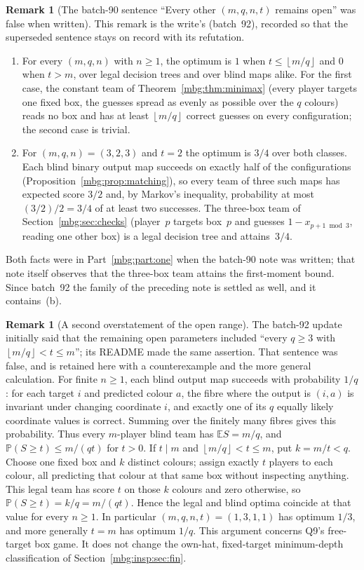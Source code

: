 \documentclass[11pt,letterpaper]{article}
\theoremstyle{definition}
\newtheorem{remark}[theorem]{Remark}
\newcommand{\E}{\mathbb E}
\newcommand{\Prb}{\mathbb P}
\newcommand{\floor}[1]{\left\lfloor #1\right\rfloor}
\begin{document}
\begin{remark}[The batch-90 sentence ``Every other $(m,q,n,t)$ remains open'' was false when written]
\label{mbg:insp:rem:q9-open-claim}
This remark is the write's (batch~92), recorded so that the superseded sentence stays on record with its refutation.
\begin{enumerate}[label=(\alph*)]
\item For every $(m,q,n)$ with $n\ge1$, the optimum is $1$ when $t\le\floor{m/q}$ and $0$ when $t>m$, over legal decision trees and over blind maps alike. For the first case, the constant team of Theorem~\ref{mbg:thm:minimax} (every player targets one fixed box, the guesses spread as evenly as possible over the $q$ colours) reads no box and has at least $\floor{m/q}$ correct guesses on every configuration; the second case is trivial.
\item For $(m,q,n)=(3,2,3)$ and $t=2$ the optimum is $3/4$ over both classes. Each blind binary output map succeeds on exactly half of the configurations (Proposition~\ref{mbg:prop:matching}), so every team of three such maps has expected score $3/2$ and, by Markov's inequality, probability at most $(3/2)/2=3/4$ of at least two successes. The three-box team of Section~\ref{mbg:sec:checks} (player~$p$ targets box~$p$ and guesses $1-x_{p+1\bmod3}$, reading one other box) is a legal decision tree and attains~$3/4$.
\end{enumerate}
Both facts were in Part~\ref{mbg:part:one} when the batch-90 note was written; that note itself observes that the three-box team attains the first-moment bound. Since batch~92 the family of the preceding note is settled as well, and it contains~(b).
\end{remark}

\begin{remark}[A second overstatement of the open range]
\label{mbg:insp:rem:q9-divisor-cases}
The batch-92 update initially said that the remaining open parameters included
``every $q\ge3$ with $\floor{m/q}<t\le m$''; its README made the same assertion.
That sentence was false, and is retained here with a counterexample and the
more general calculation.
For finite $n\ge1$, each blind output map succeeds with probability $1/q$:
for each target $i$ and predicted colour $a$, the fibre where the output is
$(i,a)$ is invariant under changing coordinate $i$, and exactly one of its
$q$ equally likely coordinate values is correct. Summing over the finitely
many fibres gives this probability. Thus every $m$-player blind team has
$\E S=m/q$, and $\Prb(S\ge t)\le m/(qt)$ for $t>0$.
If $t\mid m$ and $\floor{m/q}<t\le m$, put $k=m/t<q$. Choose one fixed box
and $k$ distinct colours; assign exactly $t$ players to each colour, all
predicting that colour at that same box without inspecting anything. This
legal team has score $t$ on those $k$ colours and zero otherwise, so
$\Prb(S\ge t)=k/q=m/(qt)$. Hence the legal and blind optima coincide at
that value for every $n\ge1$. In particular $(m,q,n,t)=(1,3,1,1)$ has
optimum $1/3$, and more generally $t=m$ has optimum $1/q$.
This argument concerns Q9's free-target box game. It does not change the
own-hat, fixed-target minimum-depth classification of Section~\ref{mbg:insp:sec:fin}.
\end{remark}
\end{document}
